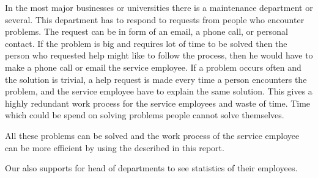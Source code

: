 In the most major businesses or universities there is a maintenance department or several. 
This department has to respond to requests from people who encounter problems. 
The request can be in form of an email, a phone call, or personal contact. 
If the problem is big and requires lot of time to be solved then the person who requested help might like to follow the process, then he would have to make a phone call or email the service employee. 
If a problem occurs often and the solution is trivial, a help request is made every time a person encounters the problem, and the service employee have to explain the same solution. 
This gives a highly redundant work process for the service employees and waste of time.
Time which could be spend on solving problems people cannot solve themselves. 

All these problems can be solved and the work process of the service employee can be more efficient by using the \hdesk[] described in this report. 
	
Our \hdesk[] also supports for head of departments to see statistics of their employees.